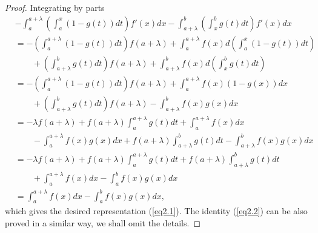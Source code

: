 \documentclass{amsart}
\theoremstyle{plain}
\numberwithin{equation}{section}
\begin{document}
\begin{proof}
Integrating by parts
\begin{align*}
&-  \int_a^{a + \lambda } {\left( {\int_a^x {\left( {1 - g\left( t
\right)} \right)dt} } \right)f'\left( x \right)dx} - \int_{a +
\lambda }^b {\left( {\int_x^b {g\left( t \right)dt} }
\right)f'\left( x \right)dx}
\\
&= - \left( {\int_a^{a + \lambda } {\left( {1 - g\left( t \right)}
\right)dt} } \right)f\left( {a + \lambda } \right) + \int_a^{a +
\lambda } {f\left( x \right)d\left( {\int_a^x {\left( {1 - g\left(
t \right)} \right)dt} } \right)}
\\
&\qquad + \left( {\int_{a + \lambda }^b {g\left( t \right)dt} }
\right)f\left( {a + \lambda } \right) + \int_{a + \lambda }^b
{f\left( x \right)d\left( {\int_x^b {g\left( t \right)dt} }
\right)}
\\
&=  - \left( {\int_a^{a + \lambda } {\left( {1 - g\left( t
\right)} \right)dt} } \right)f\left( {a + \lambda } \right) +
\int_a^{a + \lambda } {f\left( x \right)\left( {1 - g\left( x
\right)} \right)dx}
\\
&\qquad + \left( {\int_{a + \lambda }^b {g\left( t \right)dt} }
\right)f\left( {a + \lambda } \right) - \int_{a + \lambda }^b
{f\left( x \right)g\left( x \right)dx}
\\
&=  - \lambda f\left( {a + \lambda } \right) + f\left( {a +
\lambda } \right)\int_a^{a + \lambda } {g\left( t \right)dt}  +
\int_a^{a + \lambda } {f\left( x \right)dx}
\\
&\qquad - \int_a^{a + \lambda } {f\left( x \right)g\left( x
\right)dx} + f\left( {a + \lambda } \right)\int_{a + \lambda }^b
{g\left( t \right)dt}  - \int_{a + \lambda }^b {f\left( x
\right)g\left( x \right)dx}
\\
&=- \lambda f\left( {a + \lambda } \right) + f\left( {a + \lambda
} \right)\int_a^{a + \lambda } {g\left( t \right)dt}  + f\left( {a
+ \lambda } \right)\int_{a + \lambda }^b {g\left( t \right)dt}
\\
&\qquad + \int_a^{a + \lambda } {f\left( x \right)dx}  - \int_a^b
{f\left( x \right)g\left( x \right)dx}
\\
&=\int_a^{a + \lambda } {f\left( x \right)dx}  - \int_a^b {f\left(
x \right)g\left( x \right)dx},
\end{align*}
which gives the desired representation (\ref{eq2.1}). The identity
(\ref{eq2.2}) can be also proved in a similar way, we shall omit
the details.
\end{proof}
\end{document}
